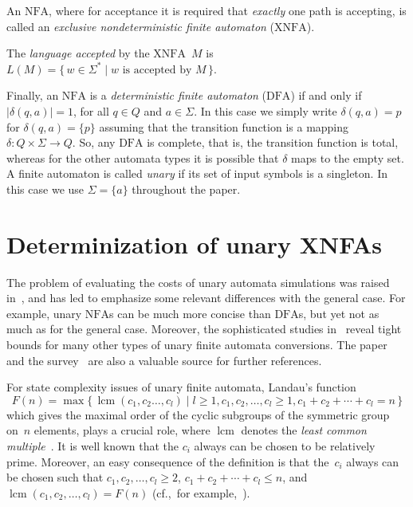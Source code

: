 \documentclass[final,copyright,noderivs]{eptcs}
\theoremstyle{plain}
\theoremstyle{definition}
\DeclareMathOperator{\lcm}{lcm}
\newcommand{\dfa}{\textrm{DFA}}
\newcommand{\nfa}{\textrm{NFA}}
\newcommand{\xnfa}{\textrm{XNFA}}
\begin{document}
An $\nfa$, where for acceptance
it is required that \emph{exactly} one path is accepting,
is called an \emph{exclusive nondeterministic finite
automaton} ($\xnfa$).

The \emph{language accepted} by the $\xnfa$~$M$ is 
$L(M) = \{\,w\in \Sigma^*\mid w \text{ is accepted by } M\,\}$.

Finally, an $\nfa$ is a \emph{deterministic
finite automaton} ($\dfa$) if and only if $|\delta(q,a)|=1$, for all $q\in Q$ 
and $a\in\Sigma$. In this case we
simply write $\delta(q,a)=p$ for $\delta(q,a)=\{p\}$ assuming that the
transition function is a mapping $\delta\colon Q \times\Sigma\to Q$. 
So, any $\dfa$ is complete, that is, the transition function is
total, whereas for the other automata types it is possible that $\delta$ maps to the 
empty set. 
A finite automaton is called \emph{unary} if its set of 
input symbols is a singleton. In this case we use $\Sigma=\{a\}$ throughout 
the paper.



\section{Determinization of unary XNFAs}\label{sect:det}

The problem of evaluating the costs of unary automata simulations was raised
in~\cite{Sipser:1980:lpssa}, and has led to emphasize some relevant
differences with the general case. For example, unary $\nfa$s can be much 
more concise than $\dfa$s, but yet not as much as for the general case.
Moreover, the sophisticated studies in~\cite{Mereghetti:2001:osbua}
reveal tight bounds for many other types of unary finite automata conversions.
The paper and the survey~\cite{pighizzini:2015:ialoaua} are also a
valuable source for further references.

For state complexity issues of unary finite automata, Landau's function
$$
F(n)=\max \{\,\lcm(c_1,c_2\dots,c_l) \mid l\geq 1, c_1,c_2,\dots,c_l \geq 1, 
c_1+c_2+\cdots + c_l=n\,\}
$$
which gives 
the maximal order of the cyclic subgroups of the symmetric group
on~$n$ elements, plays a crucial role, where $\lcm$ denotes the 
\emph{least common multiple}~\cite{Landau:1903:mpgg,Landau:1909:hlvp:book}.
It is well known that the $c_i$ always can be chosen to be relatively
prime. Moreover, an easy consequence of the definition is that
the~$c_i$ always can be chosen such that $c_1,c_2, \dots, c_l \geq 2$,
$c_1+c_2+\cdots +c_l \leq n$, and \mbox{$\lcm(c_1,c_2,\dots, c_l) = F(n)$}
(cf.,~for example,~\cite{Nicolas:1968:ssn}). 
\end{document}
